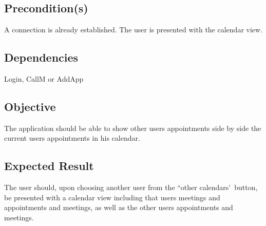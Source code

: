 \documentclass{article}
\begin{document}
\subsection{Precondition(s)}

A connection is already established. The user is presented with the calendar
view.

\subsection{Dependencies}

Login, CallM or AddApp

\subsection{Objective}

The application should be able to show other users appointments side by side
the current users appointments in his calendar.

\subsection{Expected Result}

The user should, upon choosing another user from the ``other calendars'\
button, be presented with a calendar view including that users meetings and
appointments and meetings, as well as the other users appointments and
meetings.
\end{document}
